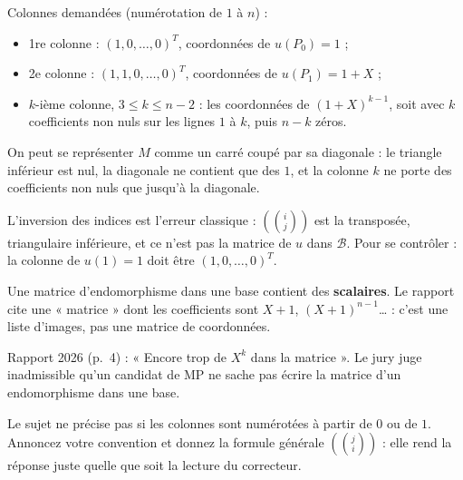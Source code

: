 \documentclass[11pt,a4paper]{article}
\providecommand{\tightlist}{\setlength{\itemsep}{0pt}\setlength{\parskip}{0pt}}
\newcommand{\equationajustee}[1]{%
  \sbox{\boiteequation}{$\displaystyle #1$}%
  \ifdim\wd\boiteequation>\linewidth
    \[\resizebox{\linewidth}{!}{\usebox{\boiteequation}}\]%
  \else
    \[#1\]%
  \fi}
\begin{document}
Colonnes demandées (numérotation de \(1\) à \(n\)) :

\begin{itemize}
\tightlist
\item
  1re colonne : \((1,0,\dots,0)^T\), coordonnées de \(u(P_0)=1\) ;
\item
  2e colonne : \((1,1,0,\dots,0)^T\), coordonnées de \(u(P_1)=1+X\) ;
\item
  \(k\)-ième colonne, \(3\le k\le n-2\) : les coordonnées de \((1+X)^{k-1}\), soit
  \equationajustee{\left(\binom{k-1}{0},\binom{k-1}{1},\dots,\binom{k-1}{k-1},0,\dots,0\right)^T,}
  avec \(k\) coefficients non nuls sur les lignes \(1\) à \(k\), puis \(n-k\) zéros.
\end{itemize}

On peut se représenter \(M\) comme un carré coupé par sa diagonale : le triangle inférieur est nul, la diagonale ne contient que des \(1\), et la colonne \(k\) ne porte des coefficients non nuls que jusqu'à la diagonale.

\begin{piege}

L'inversion des indices est l'erreur classique : \(\left(\binom ij\right)\) est la transposée, triangulaire inférieure, et ce n'est pas la matrice de \(u\) dans \(\mathscr B\). Pour se contrôler : la colonne de \(u(1)=1\) doit être \((1,0,\dots,0)^T\).

Une matrice d'endomorphisme dans une base contient des \textbf{scalaires}. Le rapport cite une « matrice » dont les coefficients sont \(X+1\), \((X+1)^{n-1}\)\ldots{} : c'est une liste d'images, pas une matrice de coordonnées.

\end{piege}

\begin{jury}

Rapport 2026 (p.~4) : « Encore trop de \(X^k\) dans la matrice ». Le jury juge inadmissible qu'un candidat de MP ne sache pas écrire la matrice d'un endomorphisme dans une base.

\end{jury}

\begin{methode}

Le sujet ne précise pas si les colonnes sont numérotées à partir de \(0\) ou de \(1\). Annoncez votre convention et donnez la formule générale \(\left(\binom ji\right)\) : elle rend la réponse juste quelle que soit la lecture du correcteur.

\end{methode}
\end{document}
